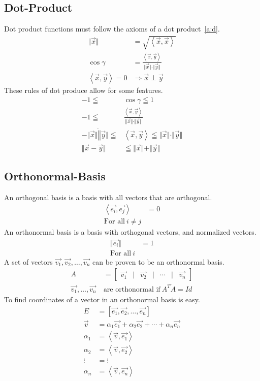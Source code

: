 \documentclass[12pt]{article}
\begin{document}
\subsection{Dot-Product}\label{o:d}
Dot product functions must follow the axioms of a dot product~\ref{a:d}.
\begin{align}
  \Vert\vec{x}\Vert &= \sqrt{\left<\vec{x},\vec{x}\right>}\\
  \cos \gamma &= \frac{\left<\vec{x},\vec{y}\right>}{\Vert\vec{x}\Vert \cdot \Vert\vec{y}\Vert}\\
  \left<\vec{x},\vec{y}\right>=0 &\Rightarrow \vec{x} \perp \vec{y}
\end{align}
These rules of dot produce allow for some features.
\begin{align}
  -1 \leqq &\cos \gamma \leqq 1\\
  -1 \leqq &\frac{\left<\vec{x},\vec{y}\right>}{\Vert\vec{x}\Vert \cdot \Vert\vec{y}\Vert}\\
  -\Vert\vec{x}\Vert\dot\Vert\vec{y}\Vert \leqq &\left<\vec{x},\vec{y}\right> \leqq \Vert\vec{x}\Vert\cdot\Vert\vec{y}\Vert\\
  \Vert\vec{x}-\vec{y}\Vert &\leqq \Vert\vec{x}\Vert+\Vert\vec{y}\Vert
\end{align}
\subsection{Orthonormal-Basis}\label{o:o}
An orthogonal basis is a basis with all vectors that are orthogonal.
\begin{align}
  \left<\vec{e_i},\vec{e_j}\right> &= 0\\
  \text{For all}\ i\neq j
\end{align}
An orthonormal basis is a basis with orthogonal vectors, and normalized vectors.
\begin{align}
  \Vert\vec{e_i}\Vert &= 1\\
  \text{For all}\ i
\end{align}
A set of vectors $\vec{v_1},\vec{v_2},\ldots,\vec{v_n}$ can be proven to be an orthonormal basis.
\begin{align}
  A &= \left[\begin{array}{ccccccc}
    \vec{v_1} & | & \vec{v_2} & | & \cdots & | & \vec{v_n}
  \end{array}\right]\\
  \vec{v_1},\ldots,\vec{v_n}\ &\text{are orthonormal if}\ A^T \dot A=Id
\end{align}
To find coordinates of a vector in an orthonormal basis is easy.
\begin{align}
  E &= \left[ \vec{e_1}, \vec{e_2}, \ldots, \vec{e_n}\right]\\
  \vec{v} &= \alpha_1\vec{e_1} + \alpha_2\vec{e_2} + \cdots + \alpha_n\vec{e_n}\\
  \alpha_1 &= \left<\vec{v}, \vec{e_1}\right>\\
  \alpha_2 &= \left<\vec{v}, \vec{e_2}\right>\\
  \vdots &= \vdots\\
  \alpha_n &= \left<\vec{v}, \vec{e_n}\right>
\end{align}
\end{document}
